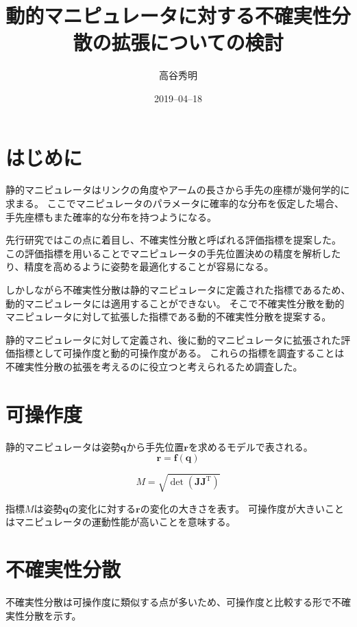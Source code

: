 \documentclass[10pt,a4j,twocolumn]{ltjsarticle}
\title{動的マニピュレータに対する不確実性分散の拡張についての検討} %
\author{高谷秀明}                              %
\date{2019--04--18}                              %
\begin{document}
\maketitle

\section{はじめに}

静的マニピュレータはリンクの角度やアームの長さから手先の座標が幾何学的に求まる。
ここでマニピュレータのパラメータに確率的な分布を仮定した場合、手先座標もまた確率的な分布を持つようになる。

先行研究ではこの点に着目し、不確実性分散と呼ばれる評価指標を提案した。
この評価指標を用いることでマニピュレータの手先位置決めの精度を解析したり、精度を高めるように姿勢を最適化することが容易になる。

しかしながら不確実性分散は静的マニピュレータに定義された指標であるため、動的マニピュレータには適用することができない。
そこで不確実性分散を動的マニピュレータに対して拡張した指標である動的不確実性分散を提案する。

静的マニピュレータに対して定義され、後に動的マニピュレータに拡張された評価指標として可操作度と動的可操作度がある。
これらの指標を調査することは不確実性分散の拡張を考えるのに役立つと考えられるため調査した。

\section{可操作度}

静的マニピュレータは姿勢$\bm{q}$から手先位置$\bm{r}$を求めるモデルで表される。
\begin{equation}
  \bm{r} = \bm{f}(\bm{q}) \label{eq:static_manipulator}
\end{equation}

\begin{equation}
  M = \sqrt{\det \left( \bm{J} \bm{J}^{\mathrm{T}} \right)}
\end{equation}

指標$M$は姿勢$\bm{q}$の変化に対する$\bm{r}$の変化の大きさを表す。
可操作度が大きいことはマニピュレータの運動性能が高いことを意味する。

\section{不確実性分散}

不確実性分散は可操作度に類似する点が多いため、可操作度と比較する形で不確実性分散を示す。
\end{document}
